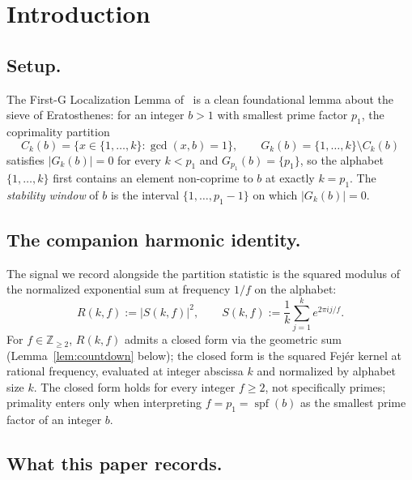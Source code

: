 \documentclass[11pt,reqno]{amsart}
\theoremstyle{plain}
\theoremstyle{definition}
\theoremstyle{remark}
\DeclareMathOperator{\spf}{spf}
\newcommand{\Z}{\mathbb{Z}}
\begin{document}
\section{Introduction}
\label{sec:intro}

\subsection*{Setup.}

The First-G Localization Lemma of~\cite{J04Sanders} is a clean
foundational lemma about the sieve of Eratosthenes: for an
integer $b > 1$ with smallest prime factor $p_1$, the coprimality
partition
\[
  C_k(b) = \{x \in \{1, \ldots, k\} : \gcd(x, b) = 1\},
  \qquad
  G_k(b) = \{1, \ldots, k\} \setminus C_k(b)
\]
satisfies $|G_k(b)| = 0$ for every $k < p_1$ and
$G_{p_1}(b) = \{p_1\}$, so the alphabet $\{1, \ldots, k\}$ first
contains an element non-coprime to $b$ at exactly $k = p_1$. The
\emph{stability window} of $b$ is the interval
$\{1, \ldots, p_1 - 1\}$ on which $|G_k(b)| = 0$.

\subsection*{The companion harmonic identity.}

The signal we record alongside the partition statistic is the
squared modulus of the normalized exponential sum at frequency
$1/f$ on the alphabet:
\begin{equation}
  R(k, f) := |S(k, f)|^2,
  \qquad
  S(k, f) := \frac{1}{k} \sum_{j=1}^{k} e^{2\pi i j / f}.
  \label{eq:Rdef}
\end{equation}
For $f \in \Z_{\ge 2}$, $R(k, f)$ admits a closed form via the
geometric sum (Lemma~\ref{lem:countdown} below); the closed form
is the squared Fej\'er kernel at rational frequency, evaluated
at integer abscissa $k$ and normalized by alphabet size $k$. The
closed form holds for every integer $f \ge 2$, not specifically
primes; primality enters only when interpreting $f = p_1 =
\spf(b)$ as the smallest prime factor of an integer $b$.

\subsection*{What this paper records.}
\end{document}
